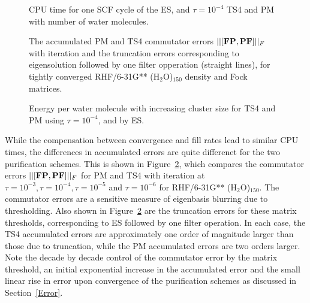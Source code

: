 \commentoutA{\documentclass[prb,aps,twocolumn,twocolumngrid,secnumarabic,superbib,hyperref]{revtex4}}
\begin{document}
\begin{figure}[b]
\caption{CPU time for one SCF cycle of the ES, and 
	 $\tau=10^{-4}$ TS4 and PM with number of water molecules.}\label{cputimes}
\end{figure}

\begin{figure}[b]
\caption{The accumulated PM and TS4 commutator errors $||[{\bf F P,P F }]||_F$ 
with iteration and the truncation errors corresponding to eigensolution followed
by one filter opperation (straight lines), for tightly converged RHF/6-31G** (H$_2$O)$_{150}$ density 
and Fock matrices.}\label{commerrors}
\end{figure}

\begin{figure}[b]
\caption{Energy per water molecule with increasing cluster size for TS4 and PM 
         using $\tau=10^{-4}$, and by ES.}\label{waterenergyerrors}
\end{figure}

While the compensation between convergence and fill rates lead to similar CPU times, 
the differences in accumulated errors are quite differenet for the two purification schemes.
This is shown in Figure~\ref{commerrors}, which compares the commutator errors $||[{\bf FP,PF}]||_F$
for PM and TS4 with iteration at $\tau=10^{-3}, \tau=10^{-4}, \tau=10^{-5}$ and $\tau=10^{-6}$
for RHF/6-31G** (H$_2$O)$_{150}$.  The commutator errors are a sensitive measure of eigenbasis
blurring due to thresholding.  Also shown in Figure~\ref{commerrors} 
are the truncation errors for these matrix thresholds, corresponding to ES followed by one 
filter operation.  In each case, the TS4 accumulated errors are approximately one order of 
magnitude larger than those due to truncation, while the PM accumulated errors are two
orders larger.  Note the decade by decade control of the commutator error by the matrix
threshold, an initial exponential increase in the accumulated error and the 
small linear rise in error upon convergence of the purification schemes as discussed
in Section~\ref{Error}.
\end{document}
